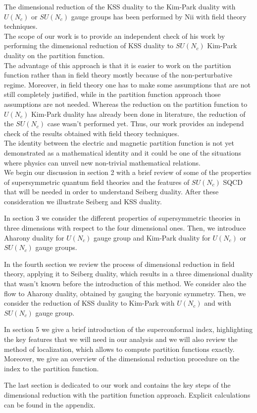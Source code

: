 The dimensional reduction of the KSS duality to the Kim-Park duality with $U(N_c)$ or $SU(N_c)$ gauge groups has been performed by Nii with field theory techniques.\\
The scope of our work is to provide an independent check of his work by performing the dimensional reduction of KSS duality to $SU(N_c)$ Kim-Park duality on the partition function.\\
The advantage of this approach is that it is easier to work on the partition function rather than in field theory mostly because of the non-perturbative regime.
Moreover, in field theory one has to make some assumptions that are not still completely justified, while in the partition function approach those assumptions are not needed.
Whereas the reduction on the partition function to $U(N_c)$ Kim-Park duality has already been done in literature, the reduction of the $SU(N_c)$ case wasn't performed yet.
Thus, our work provides an independ check of the results obtained with field theory techniques.\\
The identity between the electric and magnetic partition function is not yet demonstrated as a mathematical identity and it could be one of the situations where physics can unveil new non-trivial mathematical relations. 
\\

\pagestyle{intro}
We begin our discussion in section 2 with a brief review of some of the properties of supersymmetric quantum field theories and the features of $SU(N_c)$ SQCD that will be needed in order to understand Seiberg duality.
After these consideration we illustrate Seiberg and KSS duality.
\thispagestyle{intro}

In section 3 we consider the different properties of supersymmetric theories in three dimensions with respect to the four dimensional ones.
Then, we introduce Aharony duality for $U(N_c)$ gauge group and Kim-Park duality for $U(N_c)$ or $SU(N_c)$ gauge groups.

In the fourth section we review the process of dimensional reduction in field theory, applying it to Seiberg duality, which results in a three dimensional duality that wasn't known before the introduction of this method. 
We  consider also the flow to Aharony duality, obtained by gauging the baryonic symmetry.
Then, we consider the reduction of KSS duality to Kim-Park with $U(N_c)$ and with $SU(N_c)$ gauge group.

In section 5 we give a brief introduction of the superconformal index, highlighting the key features that we will need in our analysis and we will also review the method of localization, which allows to compute partition functions exactly.
Moreover, we give an overview of the dimensional reduction procedure on the index to the partition function.

The last section is dedicated to our work and contains the key steps of the dimensional reduction with the partition function approach. 
Explicit calculations can be found in the appendix.



